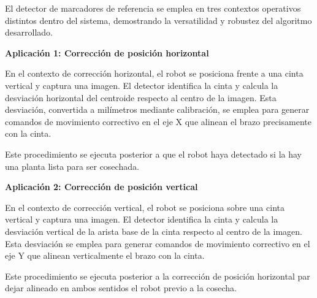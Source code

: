 El detector de marcadores de referencia se emplea en tres contextos operativos distintos dentro del sistema, demostrando la versatilidad y robustez del algoritmo desarrollado.

\textbf{Aplicación 1: Corrección de posición horizontal}

En el contexto de corrección horizontal, el robot se posiciona frente a una cinta vertical y captura una imagen. El detector identifica la cinta y calcula la desviación horizontal del centroide respecto al centro de la imagen. Esta desviación, convertida a milímetros mediante calibración, se emplea para generar comandos de movimiento correctivo en el eje X que alinean el brazo precisamente con la cinta.

Este procedimiento se ejecuta posterior a que el robot haya detectado si la hay una planta lista para ser cosechada.

\textbf{Aplicación 2: Corrección de posición vertical}

En el contexto de corrección vertical, el robot se posiciona sobre una cinta vertical y captura una imagen. El detector identifica la cinta y calcula la desviación vertical de la arista base de la cinta respecto al centro de la imagen. Esta desviación se emplea para generar comandos de movimiento correctivo en el eje Y que alinean verticalmente el brazo con la cinta.

Este procedimiento se ejecuta posterior a la corrección de posición horizontal par dejar alineado en ambos sentidos el robot previo a la cosecha.

